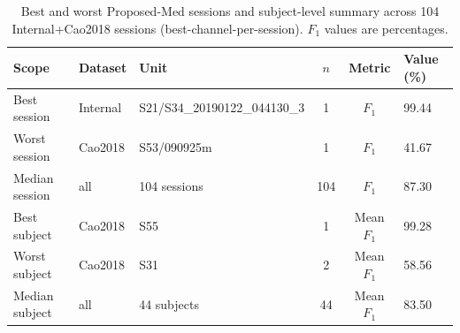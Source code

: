 \begin{table}[ht]
  \centering
  \caption{Best and worst Proposed-Med sessions and subject-level summary across 104 Internal+Cao2018 sessions (best-channel-per-session). $F_1$ values are percentages.}
  \label{tab:best-session}
  \begin{tabular}{lllccl}
    \toprule
    Scope & Dataset & Unit & $n$ & Metric & Value (\%) \\
    \midrule
    Best session & Internal & S21/S34\_20190122\_044130\_3 & 1 & $F_1$ & 99.44 \\
    Worst session & Cao2018 & S53/090925m & 1 & $F_1$ & 41.67 \\
    Median session & all & 104 sessions & 104 & $F_1$ & 87.30 \\
    Best subject & Cao2018 & S55 & 1 & Mean $F_1$ & 99.28 \\
    Worst subject & Cao2018 & S31 & 2 & Mean $F_1$ & 58.56 \\
    Median subject & all & 44 subjects & 44 & Mean $F_1$ & 83.50 \\
    \bottomrule
  \end{tabular}
\end{table}
